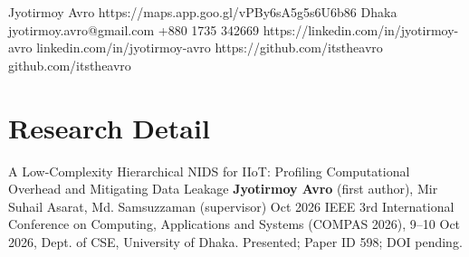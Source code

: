 \documentclass[11pt, a4paper]{article}
\begin{document}
\frenchspacing

\cvHeader
    {Jyotirmoy Avro}
    {https://maps.app.goo.gl/vPBy6sA5g5s6U6b86}
    {Dhaka}
    {jyotirmoy.avro@gmail.com}
    {+880 1735 342669}
    {https://linkedin.com/in/jyotirmoy-avro}
    {linkedin.com/in/jyotirmoy-avro}
    {https://github.com/itstheavro}
    {github.com/itstheavro}

\section{Research Detail}

\cvPublication
    {A Low-Complexity Hierarchical NIDS for IIoT: Profiling Computational Overhead and Mitigating Data Leakage}
    {\textbf{Jyotirmoy Avro} (first author), Mir Suhail Asarat, Md. Samsuzzaman (supervisor)}
    {Oct 2026}
    {IEEE 3rd International Conference on Computing, Applications and Systems (COMPAS 2026), 9--10 Oct 2026, Dept. of CSE, University of Dhaka. Presented; Paper ID 598; DOI pending.}
    {}
    {}

\end{document}
